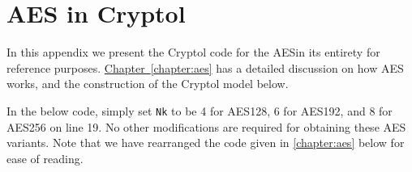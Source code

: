 \chapter{AES in Cryptol}\label{app:aes}

In this appendix we present the Cryptol code for the AES\indAES in its
entirety for reference purposes.
\hyperref[chapter:aes]{Chapter~\ref*{chapter:aes}} has a detailed
discussion on how AES works, and the construction of the Cryptol model
below.

In the below code, simply set {\tt Nk} to be 4 for AES128, 6 for
AES192, and 8 for AES256 on line 19. No other modifications are
required for obtaining these AES variants. Note that we have
rearranged the code given in \autoref{chapter:aes} below for ease
of reading.


